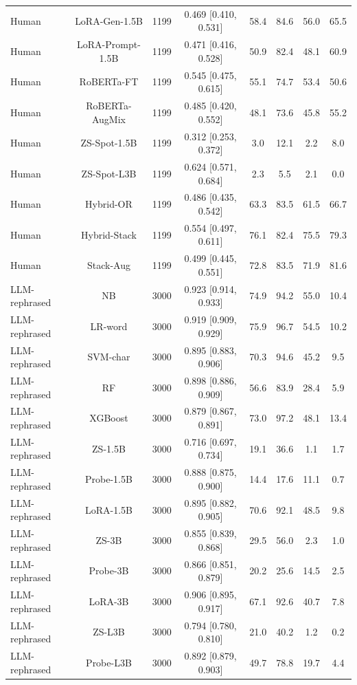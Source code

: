 \begin{table}[t]
\begin{tabular}{lccccccc}
Human & LoRA-Gen-1.5B & 1199 & 0.469 [0.410, 0.531] & 58.4 & 84.6 & 56.0 & 65.5 \\
Human & LoRA-Prompt-1.5B & 1199 & 0.471 [0.416, 0.528] & 50.9 & 82.4 & 48.1 & 60.9 \\
Human & RoBERTa-FT & 1199 & 0.545 [0.475, 0.615] & 55.1 & 74.7 & 53.4 & 50.6 \\
Human & RoBERTa-AugMix & 1199 & 0.485 [0.420, 0.552] & 48.1 & 73.6 & 45.8 & 55.2 \\
Human & ZS-Spot-1.5B & 1199 & 0.312 [0.253, 0.372] & 3.0 & 12.1 & 2.2 & 8.0 \\
Human & ZS-Spot-L3B & 1199 & 0.624 [0.571, 0.684] & 2.3 & 5.5 & 2.1 & 0.0 \\
Human & Hybrid-OR & 1199 & 0.486 [0.435, 0.542] & 63.3 & 83.5 & 61.5 & 66.7 \\
Human & Hybrid-Stack & 1199 & 0.554 [0.497, 0.611] & 76.1 & 82.4 & 75.5 & 79.3 \\
Human & Stack-Aug & 1199 & 0.499 [0.445, 0.551] & 72.8 & 83.5 & 71.9 & 81.6 \\
LLM-rephrased & NB & 3000 & 0.923 [0.914, 0.933] & 74.9 & 94.2 & 55.0 & 10.4 \\
LLM-rephrased & LR-word & 3000 & 0.919 [0.909, 0.929] & 75.9 & 96.7 & 54.5 & 10.2 \\
LLM-rephrased & SVM-char & 3000 & 0.895 [0.883, 0.906] & 70.3 & 94.6 & 45.2 & 9.5 \\
LLM-rephrased & RF & 3000 & 0.898 [0.886, 0.909] & 56.6 & 83.9 & 28.4 & 5.9 \\
LLM-rephrased & XGBoost & 3000 & 0.879 [0.867, 0.891] & 73.0 & 97.2 & 48.1 & 13.4 \\
LLM-rephrased & ZS-1.5B & 3000 & 0.716 [0.697, 0.734] & 19.1 & 36.6 & 1.1 & 1.7 \\
LLM-rephrased & Probe-1.5B & 3000 & 0.888 [0.875, 0.900] & 14.4 & 17.6 & 11.1 & 0.7 \\
LLM-rephrased & LoRA-1.5B & 3000 & 0.895 [0.882, 0.905] & 70.6 & 92.1 & 48.5 & 9.8 \\
LLM-rephrased & ZS-3B & 3000 & 0.855 [0.839, 0.868] & 29.5 & 56.0 & 2.3 & 1.0 \\
LLM-rephrased & Probe-3B & 3000 & 0.866 [0.851, 0.879] & 20.2 & 25.6 & 14.5 & 2.5 \\
LLM-rephrased & LoRA-3B & 3000 & 0.906 [0.895, 0.917] & 67.1 & 92.6 & 40.7 & 7.8 \\
LLM-rephrased & ZS-L3B & 3000 & 0.794 [0.780, 0.810] & 21.0 & 40.2 & 1.2 & 0.2 \\
LLM-rephrased & Probe-L3B & 3000 & 0.892 [0.879, 0.903] & 49.7 & 78.8 & 19.7 & 4.4 \\

\end{tabular}
\end{table}
